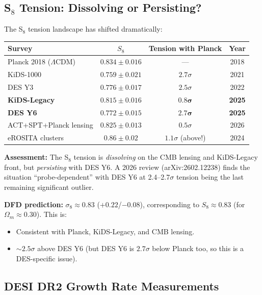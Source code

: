 \documentclass[11pt]{article}
\newcommand{\LCDM}{$\Lambda$CDM}
\newcommand{\Om}{\Omega_m}
\begin{document}
\subsection{S$_8$ Tension: Dissolving or Persisting?}

The S$_8$ tension landscape has shifted dramatically:

\begin{center}
\begin{tabular}{lccc}
\toprule
\textbf{Survey} & $S_8$ & \textbf{Tension with Planck} & \textbf{Year} \\
\midrule
Planck 2018 (\LCDM) & $0.834 \pm 0.016$ & --- & 2018 \\
KiDS-1000 & $0.759 \pm 0.021$ & $2.7\sigma$ & 2021 \\
DES Y3 & $0.776 \pm 0.017$ & $2.5\sigma$ & 2022 \\
\textbf{KiDS-Legacy} & $\mathbf{0.815 \pm 0.016}$ & $\mathbf{0.8\sigma}$ & \textbf{2025} \\
\textbf{DES Y6} & $\mathbf{0.772 \pm 0.015}$ & $\mathbf{2.7\sigma}$ & \textbf{2025} \\
ACT+SPT+Planck lensing & $0.825 \pm 0.013$ & $0.5\sigma$ & 2026 \\
eROSITA clusters & $0.86 \pm 0.02$ & $1.1\sigma$ (above!) & 2024 \\
\bottomrule
\end{tabular}
\end{center}

\textbf{Assessment:} The S$_8$ tension is \emph{dissolving} on the CMB
lensing and KiDS-Legacy front, but \emph{persisting} with DES Y6. A 2026
review (arXiv:2602.12238) finds the situation ``probe-dependent'' with
DES Y6 at 2.4--2.7$\sigma$ tension being the last remaining significant
outlier.

\textbf{DFD prediction:} $\sigma_8 \approx 0.83$ ($+0.22$/$-0.08$),
corresponding to $S_8 \approx 0.83$ (for $\Om \approx 0.30$). This is:
\begin{itemize}
  \item Consistent with Planck, KiDS-Legacy, and CMB lensing.
  \item $\sim 2.5\sigma$ above DES Y6 (but DES Y6 is $2.7\sigma$ below
    Planck too, so this is a DES-specific issue).
\end{itemize}

\subsection{DESI DR2 Growth Rate Measurements}
\end{document}
